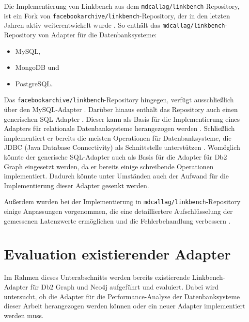 Die Implementierung von Linkbench aus dem \texttt{mdcallag/linkbench}-Repository, ist ein Fork von \texttt{facebookarchive\allowbreak /linkbench}-Repository, der in den letzten Jahren aktiv weiterentwickelt wurde \cite{mc_linkbench_github}. So enthält das \texttt{mdcallag/linkbench}-Repository von  Adapter für die Datenbanksysteme: 
\begin{itemize}
    \item MySQL,
    \item MongoDB und
    \item PostgreSQL.
\end{itemize}
Das \texttt{facebookarchive/\allowbreak linkbench}-Repository hingegen, verfügt ausschließlich über den MySQL-Adapter \cite{mc_linkbench_github}. Darüber hinaus enthält das Repository auch einen generischen SQL-Adapter \cite{mc_linkbench_github}. Dieser kann als Basis für die Implementierung eines Adapters für relationale Datenbanksysteme herangezogen werden \cite{mc_linkbench_github}. Schließlich implementiert er bereits die meisten Operationen für Datenbanksysteme, die JDBC (Java Database Connectivity) als Schnittstelle unterstützen \cite{mc_linkbench_github}. Womöglich könnte der generische SQL-Adapter auch als Basis für die Adapter für Db2 Graph eingesetzt werden, da er bereits einige schreibende Operationen implementiert. Dadurch könnte unter Umständen auch der Aufwand für die Implementierung dieser Adapter gesenkt werden.

Außerdem wurden bei der Implementierung in \texttt{mdcallag/linkbench}-Repository einige Anpassungen vorgenommen, die eine detailliertere Aufschlüsselung der gemessenen Latenzwerte ermöglichen und die Fehlerbehandlung verbessern \cite{mc_linkbench_github}.

\section{Evaluation existierender Adapter}
\label{implementierung:evaluation}
Im Rahmen dieses Unterabschnitts werden bereits existierende Linkbench-Adapter für Db2 Graph und Neo4j aufgeführt und evaluiert. Dabei wird untersucht, ob die Adapter für die Performance-Analyse der Datenbanksysteme dieser Arbeit herangezogen werden können oder ein neuer Adapter implementiert werden muss. 

